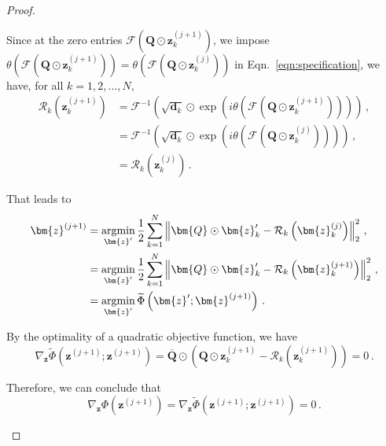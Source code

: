 \documentclass{article}
\numberwithin{equation}{section}
\begin{document}
\begin{proof}
\begin{enumerate}
Since at the zero entries $\mathcal{F}\left(\bm{Q}\odot \bm{z}_k^{(j+1)}\right)$, we impose $\theta\left(\mathcal{F}\left(\bm{Q}\odot \bm{z}_k^{(j+1)}\right)\right) = \theta\left(\mathcal{F}\left(\bm{Q}\odot \bm{z}_k^{(j)}\right)\right)$ in Eqn.~\ref{eqn:specification}, we have, for all $k=1,2,\dots,N$,  
\begin{equation*}
    \begin{aligned}
        \mathcal{R}_k\left(\bm{z}^{(j+1)}_k\right) &= \mathcal{F}^{-1}\left(\sqrt{\bm{d}_k}\odot \exp\left(i \theta\left(\mathcal{F}\left(\bm{Q}\odot \bm{z}_k^{(j+1)}\right)\right)\right)\right)\,,\\
        &= \mathcal{F}^{-1}\left(\sqrt{\bm{d}_k}\odot \exp\left(i \theta\left(\mathcal{F}\left(\bm{Q}\odot \bm{z}_k^{(j)}\right)\right)\right)\right)\,,\\
        &= \mathcal{R}_k\left(\bm{z}^{(j)}_k\right)\,.
    \end{aligned}
\end{equation*}

That leads to
\begin{equation*}
\begin{aligned}
    \bm{z}^{(j+1)}
    &=\operatornamewithlimits{argmin}_{\bm{z}'} \frac{1}{2} \sum_{k=1}^N \left\|\bm{Q}\odot\bm{z}'_k - \mathcal{R}_k\left(\bm{z}^{(j)}_k\right)\right\|_2^2\,,\\
    &=\operatornamewithlimits{argmin}_{\bm{z}'} \frac{1}{2} \sum_{k=1}^N \left\|\bm{Q}\odot\bm{z}'_k - \mathcal{R}_k\left(\bm{z}^{(j+1)}_k\right)\right\|_2^2\,,\\
     &=\operatornamewithlimits{argmin}_{\bm{z}'} \widetilde{\Phi}\left(\bm{z}';\bm{z}^{(j+1)}\right)\,.\\
\end{aligned}
\end{equation*}

By the optimality of a quadratic objective function, we have
\begin{equation*}
    \nabla_{\bm{z}} \widetilde{\Phi}\left(\bm{z}^{(j+1)};\bm{z}^{(j+1)}\right) = \overline{\bm{Q}}\odot\left(\bm{Q}\odot \bm{z}_k^{(j+1)} -\mathcal{R}_k\left(\bm{z}_k^{(j+1)}\right)\right) = 0\,.
\end{equation*}

Therefore, we can conclude that
\begin{equation*}
    \nabla_{\bm{z}}\Phi\left(\bm{z}^{(j+1)}\right) = \nabla_{\bm{z}} \widetilde{\Phi}\left(\bm{z}^{(j+1)};\bm{z}^{(j+1)}\right) = 0\,.
\end{equation*}

\end{enumerate}
\end{proof}
\end{document}
